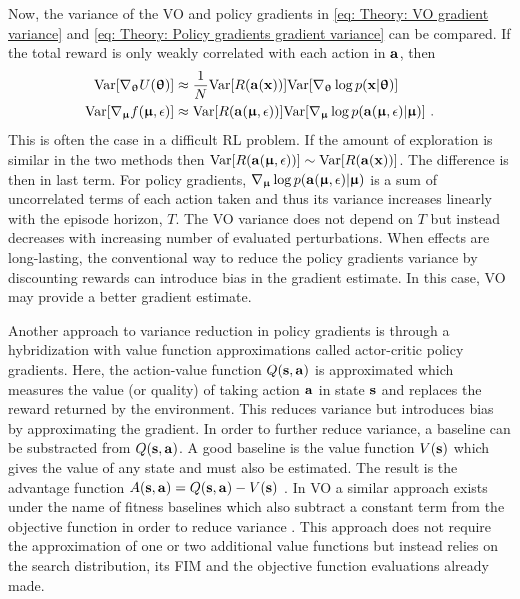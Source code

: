 Now, the variance of the \gls{VO} and policy gradients in \eqref{eq: Theory: VO gradient variance} and \eqref{eq: Theory: Policy gradients gradient variance} can be compared. 
If the total reward is only weakly correlated with each action in ${\mathbf{a}}$, then 
\begin{align}
    \text{Var}{\left[\nabla_{\boldsymbol{\uptheta}}U({\boldsymbol{\uptheta}})\right]} &\approx \frac{1}{N}\text{Var}{\left[R({\mathbf{a}}({\mathbf{x}}))\right]}\text{Var}{\left[\nabla_{\boldsymbol{\uptheta}}\log p({\mathbf{x}}|{\boldsymbol{\uptheta}})\right]}\\
    \text{Var}{\left[\nabla_{\boldsymbol{\upmu}}f({\boldsymbol{\upmu}}, \epsilon)\right]} &\approx \text{Var}{\left[R({\mathbf{a}}({\boldsymbol{\upmu}}, \epsilon))\right]}\text{Var}{\left[\nabla_{\boldsymbol{\upmu}}\log p({\mathbf{a}}({\boldsymbol{\upmu}},\epsilon)|{\boldsymbol{\upmu}})\right]} \ .
\end{align}
This is often the case in a difficult \gls{RL} problem.
If the amount of exploration is similar in the two methods then $\text{Var}{\left[R({\mathbf{a}}({\boldsymbol{\upmu}}, \epsilon))\right]}\sim\text{Var}{\left[R({\mathbf{a}}({\mathbf{x}}))\right]}$. The difference is then in last term. 
For policy gradients, $\nabla_{\boldsymbol{\upmu}}\log p({\mathbf{a}}({\boldsymbol{\upmu}},\epsilon)|{\boldsymbol{\upmu}})$ is a sum of uncorrelated terms of each action taken and thus its variance increases linearly with the episode horizon, $T$. The \gls{VO} variance does not depend on $T$ but instead decreases with increasing number of evaluated perturbations. When effects are long-lasting, the conventional way to reduce the policy gradients variance by discounting rewards can introduce bias in the gradient estimate. In this case, \gls{VO} may provide a better gradient estimate. 

Another approach to variance reduction in policy gradients is through a hybridization with value function approximations called actor-critic policy gradients. Here, the action-value function $Q({\mathbf{s}},{\mathbf{a}})$ is approximated which measures the value (or quality) of taking action ${\mathbf{a}}$ in state ${\mathbf{s}}$ and replaces the reward returned by the environment. This reduces variance but introduces bias by approximating the gradient. In order to further reduce variance, a baseline can be substracted from $Q({\mathbf{s}},{\mathbf{a}})$. A good baseline is the value function $V({\mathbf{s}})$ which gives the value of any state and must also be estimated. The result is the advantage function $A({\mathbf{s}},{\mathbf{a}})=Q({\mathbf{s}},{\mathbf{a}})-V({\mathbf{s}})$ \cite{Arulkumaran2017}. In \gls{VO} a similar approach exists under the name of fitness baselines which also subtract a constant term from the objective function in order to reduce variance \cite{Yi2009}. This approach does not require the approximation of one or two additional value functions but instead relies on the search distribution, its \gls{FIM} and the objective function evaluations already made.


